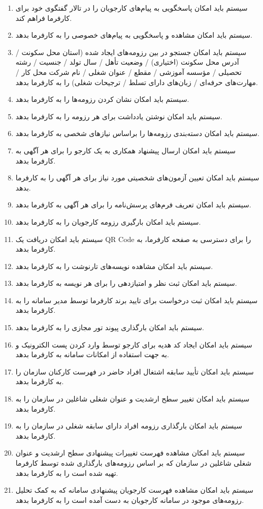 \documentclass[12pt]{article}
\begin{document}
\begin{itemize}
\begin{enumerate}
			\item سیستم باید امکان پاسخگویی به پیام‌های کارجویان را در تالار گفتگوی خود برای کارفرما فراهم کند.
			\item سیستم باید امکان مشاهده و پاسخگویی به پیام‌های خصوصی را به کارفرما بدهد.
			\item سیستم باید امکان جستجو در بین رزومه‌های ایجاد شده (استان محل سکونت / آدرس محل سکونت (اختیاری) / وضعیت تأهل / سال تولد / جنسیت /  رشته تحصیلی / مؤسسه آموزشی / مقطع / عنوان شغلی / نام شرکت محل کار / مهارت‌های حرفه‌ای / زبان‌های دارای تسلط / ترجیحات شغلی) را به کارفرما بدهد.
			\item سیستم باید امکان نشان کردن رزومه‌ها را به کارفرما بدهد.
			\item سیستم باید امکان نوشتن یادداشت برای هر رزومه را به کارفرما بدهد.
			\item سیستم باید امکان دسته‌بندی رزومه‌ها را براساس نیازهای شخصی به کارفرما بدهد.
			\item سیستم باید امکان ارسال پیشنهاد همکاری به یک کارجو را برای هر آگهی به کارفرما بدهد.
			\item سیستم باید امکان تعیین آزمون‌های شخصیتی مورد نیاز برای هر آگهی را به کارفرما بدهد.
			\item سیستم باید امکان تعریف فرم‌های پرسش‌نامه را برای هر آگهی به کارفرما بدهد.
			\item سیستم باید امکان بارگیری رزومه کارجویان را به کارفرما بدهد.
			\item سیستم باید امکان دریافت یک QR Code را برای دسترسی به صفحه کارفرما، به کارفرما بدهد.
			\item سیستم باید امکان مشاهده نویسه‌های تارنوشت را به کارفرما بدهد.
			\item سیستم باید امکان ثبت نظر و امتیازدهی را برای هر نویسه به کارفرما بدهد.
			\item سیستم باید امکان ثبت درخواست برای تایید برند کارفرما توسط مدیر سامانه را به کارفرما بدهد.
			\item سیستم باید امکان بارگذاری پیوند تور مجازی را به کارفرما بدهد.
			\item سیستم باید امکان ایجاد کد هدیه برای کارجو توسط وارد کردن پست الکترونیک و به جهت استفاده از امکانات سامانه به کارفرما بدهد.
			\item سیستم باید امکان تأیید سابقه اشتغال افراد حاضر در فهرست کارکنان سازمان را به کارفرما بدهد.
			\item سیستم باید امکان تغییر سطح ارشدیت و عنوان شغلی شاغلین در سازمان را به کارفرما بدهد.
			\item سیستم باید امکان بارگذاری رزومه افراد دارای سابقه شغلی در سازمان را به کارفرما بدهد.
			\item سیستم باید امکان مشاهده فهرست تغییرات پیشنهادی سطح ارشدیت و عنوان شغلی شاغلین در سازمان که بر اساس رزومه‌های بارگذاری شده توسط کارفرما تهیه شده است را به کارفرما بدهد.
			\item سیستم باید امکان مشاهده فهرست کارجویان پیشنهادی سامانه که به کمک تحلیل رزومه‌های موجود در سامانه کارجویان به دست آمده است را به کارفرما بدهد.
		\end{enumerate}
	\end{itemize}
\end{document}
